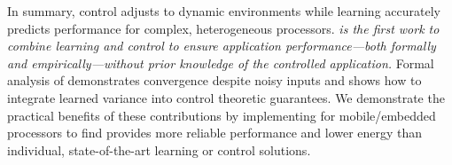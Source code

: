 In summary, control adjusts to dynamic environments while learning
accurately predicts performance for complex, heterogeneous processors.
\emph{\SYSTEM{} is the first work to combine learning and control to
  ensure application performance---both formally and
  empirically---without prior knowledge of the controlled
  application.}  Formal analysis of \SYSTEM{} demonstrates convergence
despite noisy inputs and shows how to integrate learned variance into
control theoretic guarantees.  We demonstrate the practical benefits
of these contributions by implementing \SYSTEM{} for mobile/embedded
processors to find \SYSTEM{} provides more reliable performance and
lower energy than individual, state-of-the-art learning or control
solutions.


